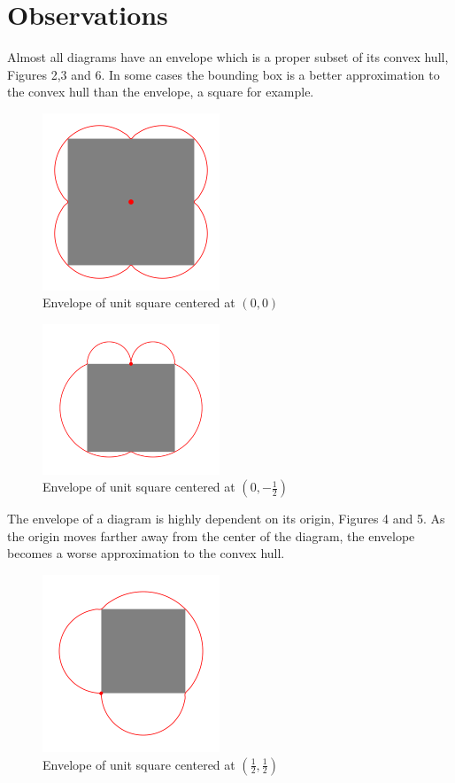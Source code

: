 \documentclass[11pt]{amsart}
\begin{document}
  \section{Observations}

  Almost all diagrams have an envelope which is a proper subset of its convex hull, Figures 2,3 and 6.
  In some cases the bounding box is a better approximation to the convex hull than the envelope, a square
  for example.

  \begin{figure}[h]
    \label{s00}
    \centering
    \includegraphics[width=150pt]{sq1_0_0.png}
    \caption{Envelope of unit square centered at $(0,0)$}
  \end{figure}

  \begin{figure}[h]
    \label{s05}
    \centering
    \includegraphics[width=150pt]{sq1_05.png}
    \caption{Envelope of unit square centered at $(0,-\frac{1}{2})$}
  \end{figure}

  The envelope of a diagram is highly dependent on its origin, Figures 4 and 5.
  As the origin moves farther away from the center of the diagram, the envelope becomes a
  worse approximation to the convex hull.

  \begin{figure}[h]
    \label{s55}
    \centering
    \includegraphics[width=150pt]{sq1_55.png}
    \caption{Envelope of unit square centered at $(\frac{1}{2}, \frac{1}{2})$}
  \end{figure}
\end{document}

